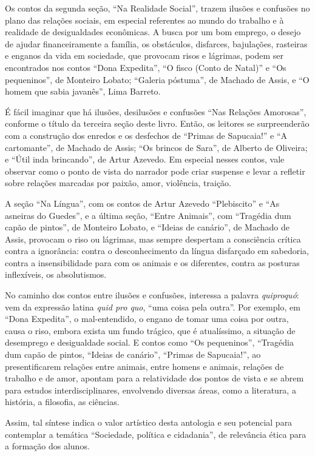 Os contos da segunda seção, ``Na Realidade Social'', trazem ilusões e
confusões no plano das relações sociais, em especial referentes ao mundo
do trabalho e à realidade de desigualdades econômicas. A busca por um
bom emprego, o desejo de ajudar financeiramente a família, os
obstáculos, disfarces, bajulações, rasteiras e enganos da vida em
sociedade, que provocam risos e lágrimas, podem ser encontrados nos
contos ``Dona Expedita'', ``O fisco (Conto de Natal)'' e ``Os
pequeninos'', de Monteiro Lobato; ``Galeria póstuma'', de Machado de
Assis, e ``O homem que sabia javanês'', Lima Barreto.

É fácil imaginar que há ilusões, desilusões e confusões ``Nas Relações
Amorosas'', conforme o título da terceira seção deste livro. Então, os
leitores se surpreenderão com a construção dos enredos e os desfechos de
``Primas de Sapucaia!'' e ``A cartomante'', de Machado de Assis; ``Os
brincos de Sara'', de Alberto de Oliveira; e ``Útil inda brincando'', de
Artur Azevedo. Em especial nesses contos, vale observar como o ponto de
vista do narrador pode criar suspense e levar a refletir sobre relações
marcadas por paixão, amor, violência, traição.

A seção ``Na Língua'', com os contos de Artur Azevedo
``Plebiscito'' e ``As asneiras do Guedes'', e a última seção, ``Entre
Animais'', com ``Tragédia dum capão de pintos'', de Monteiro Lobato, e
``Ideias de canário'', de Machado de Assis, provocam o riso ou lágrimas,
mas sempre despertam a consciência crítica contra a ignorância: contra o
desconhecimento da língua disfarçado em sabedoria, contra a
insensibilidade para com os animais e os diferentes, contra as posturas
inflexíveis, os absolutismos.

No caminho dos contos entre ilusões e confusões, interessa a
palavra \emph{quiproquó}: vem da expressão latina \emph{quid pro quo},
``uma coisa pela outra''. Por exemplo, em ``Dona Expedita'', o
mal-entendido, o engano de tomar uma coisa por outra, causa o riso,
embora exista um fundo trágico, que é atualíssimo, a situação de
desemprego e desigualdade social. E contos como ``Os pequeninos'',
``Tragédia dum capão de pintos, ``Ideias de canário'', ``Primas de
Sapucaia!'', ao presentificarem relações entre animais, entre homens e
animais, relações de trabalho e de amor, apontam para a relatividade dos
pontos de vista e se abrem para estudos interdisciplinares, envolvendo
diversas áreas, como a literatura, a história, a filosofia, as
ciências.

Assim, tal síntese indica o valor artístico desta antologia e
seu potencial para contemplar a temática ``Sociedade, política e
cidadania'', de relevância ética para a formação dos alunos.

